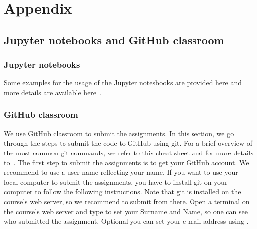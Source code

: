 \documentclass[11pt,fleqn]{book} %
\begin{document}
\part{Appendix}

\chapter*{Jupyter notebooks and GitHub classroom}

\section*{Jupyter notebooks}

Some examples for the usage of the Jupyter notesbooks are provided here and more details are available here~\cite{diehl2020gateways}.

\section*{GitHub classroom}

We use GitHub classroom to submit the assignments. In this section, we go through the steps to submit the code to GitHub using git. For a brief overview of the most common git commands, we refer to this cheat sheet and for more details to~\cite{silverman2013git,laster2016professional}. The first step to submit the assignments is to get your GitHub account. We recommend to use a user name reflecting your name. If you want to use your local computer to submit the assignments, you have to install git on your computer to follow the following instructions. Note that git is installed on the course's web server, so we recommend to submit from there. Open a terminal on the course's web server and type  to set your Surname and Name, so one can see who submitted the assignment. Optional you can set your e-mail address using . \\
\end{document}
